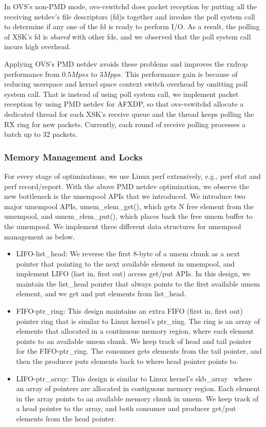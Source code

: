 \documentclass[10pt]{sigplanconf}
\begin{document}
In OVS's non-PMD mode, ovs-vswitchd does packet reception by putting all the
receiving netdev's file descriptors (fd)s together and invokes the poll system
call to determine if any one of the fd is ready to perform I/O.  As a result,
the polling of XSK's fd  is {\em shared} with other fds, and
we observed that the poll system call incurs high overhead.

Applying OVS's PMD netdev avoids these problems and improves the rxdrop performance
from $0.5Mpss$ to $3Mpps$. This performance gain is because of reducing userspace
and kernel space context switch overhead by omitting poll system call.
That is instead of using poll system call, we implement packet reception by using
PMD netdev for AFXDP, so that ovs-vswitchd allocate a dedicated thread for each
XSK's receive queue and the thread keeps polling the RX ring for new packets.
Currently, each round of receive polling processes a batch up to 32 packets.

\subsubsection{Memory Management and Locks}\label{memorym}
For every stage of optimizations, we use Linux perf extensively, e.g., perf stat
and perf record/report.  With the above PMD netdev optimization, we observe the
new bottleneck is the umempool APIs that we introduced.
We introduce two major umempool APIs, umem\_elem\_get(), which gets N free
element from the umempool, and umem\_elem\_put(), which places back the free
umem buffer to the umempool. We implement three different data structures for
umempool management as below.
\begin{itemize}
\item LIFO-list\_head: We reverse the first 8-byte of a umem chunk as a next
pointer that pointing to the next available element in umempool, and implement
LIFO (last in, first out) access get/put APIs. In this design, we maintain the
list\_head pointer that always points to the first available umem element,
and we get and put elements from list\_head.
\item FIFO-ptr\_ring: This design maintains an extra FIFO (first in, first out)
pointer ring that is similar to Linux kernel's ptr\_ring. The ring is an array
of elements that allocated in a continuous memory region, where each element
points to an available umem chunk. We keep track of head and tail pointer for
the FIFO-ptr\_ring. The consumer gets elements from the tail pointer,
and then the producer puts elements back to where head pointer points to.
\item LIFO-ptr\_array: This design is similar to Linux kernel's
skb\_array~\cite{skbarray} where an array of pointers are allocated
in contiguous memory region. Each element in the array points to an available
memory chunk in umem.  We keep track of a head pointer to the array,
and both consumer and producer get/put elements from the head pointer.
\end{itemize}
\end{document}
